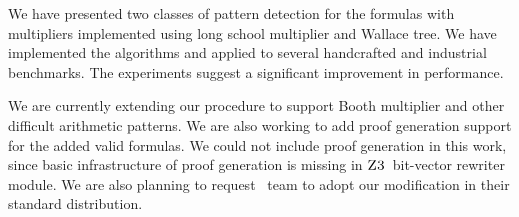 We have presented two classes of pattern detection for the formulas with
multipliers implemented using long school multiplier and Wallace tree.
%
We have implemented the algorithms and applied to several handcrafted and 
industrial benchmarks.
%
The experiments suggest a significant improvement in performance.

We are currently extending our procedure to support Booth multiplier
and other difficult arithmetic patterns.
%
We are also working to add proof generation support
for the added valid formulas.
%
We could not include proof generation in this work, since basic infrastructure
of proof generation is missing in $\textsc{Z3}$~bit-vector rewriter module.
%
We are also planning to request \zthree~team to adopt our modification in their
standard distribution.



